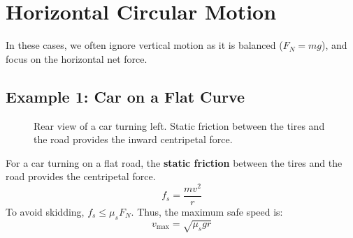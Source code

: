 \documentclass{article}
\begin{document}
\newpage

\section{Horizontal Circular Motion}

In these cases, we often ignore vertical motion as it is balanced ($F_N = mg$), and focus on the horizontal net force.

\subsection{Example 1: Car on a Flat Curve}


\begin{figure}[h]
    \centering
    \caption{Rear view of a car turning left. Static friction between the tires and the road provides the inward centripetal force.}
\end{figure}

For a car turning on a flat road, the \textbf{static friction} between the tires and the road provides the centripetal force.
\begin{equation*}
    f_s = \frac{mv^2}{r}
\end{equation*}
To avoid skidding, $f_s \leq \mu_s F_N$. Thus, the maximum safe speed is:
\begin{equation}
    v_{\text{max}} = \sqrt{\mu_s g r}
\end{equation}
\end{document}
